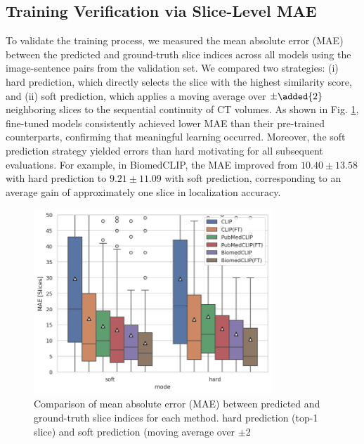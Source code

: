 \documentclass[bioengineering,article,submit,pdftex,moreauthors]{Definitions/mdpi}
\begin{document}
\subsection{Training Verification via Slice-Level MAE}

  To validate the training process, we measured the mean absolute error (MAE) between the predicted and ground-truth slice indices across all models using the image-sentence pairs from the validation set. 
  We compared two strategies: (i) hard prediction, which directly selects the slice with the highest similarity score, and (ii) soft prediction, which applies a moving average over $\pm\added{ 2}$ neighboring slices to  the sequential continuity of CT volumes. 
  As shown in Fig. \ref{fig:mae}, fine-tuned models consistently achieved lower MAE than their pre-trained counterparts, confirming that meaningful learning occurred. 
  Moreover, the soft prediction strategy yielded  errors than hard  motivating   for all subsequent evaluations. For example, in BiomedCLIP, the MAE improved from $10.40 \pm 13.58$ with hard prediction to $9.21 \pm 11.09$ with soft prediction, corresponding to an average gain of approximately one slice in localization accuracy.

\begin{figure}[ht]
  \centering
  \includegraphics[width=0.8\textwidth]{./figures/mae.png}
  \caption{
    Comparison of mean absolute error (MAE) between predicted and ground-truth slice indices for each method. 
     hard prediction (top-1 slice) and soft prediction (moving average over $\pm$2 
  }
  \label{fig:mae}
\end{figure}
\end{document}
